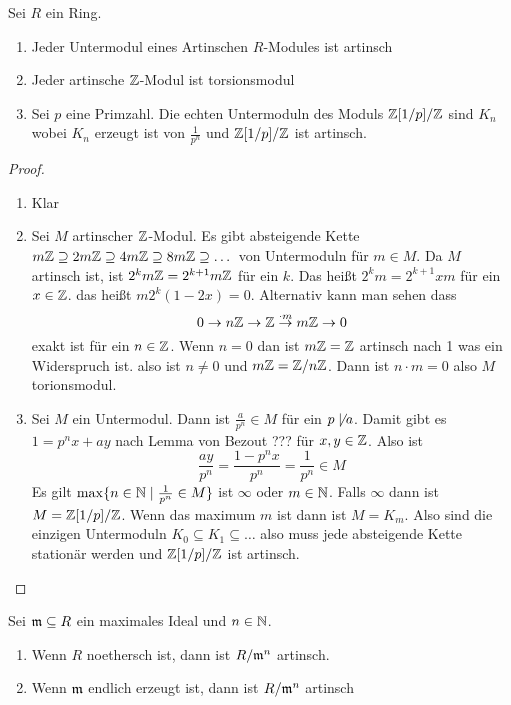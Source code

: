 \begin{Lemma}
    Sei \(R\) ein Ring.
    \begin{enumerate}
        \item Jeder Untermodul eines Artinschen \(R\)-Modules ist artinsch
        \item Jeder artinsche \(\mathbb{Z}\)-Modul ist torsionsmodul
        \item Sei \(p\) eine Primzahl. Die echten Untermoduln des Moduls \(\mathbb{Z}[1/p]/\mathbb{Z}\) sind \(K_n\) wobei \(K_n\) erzeugt ist von \(\frac{1}{p^n}\) und \(\mathbb{Z}[1/p]/\mathbb{Z}\) ist artinsch.
    \end{enumerate}
\end{Lemma}
\begin{proof}
    \begin{enumerate}
        \item Klar
        \item Sei \(M\) artinscher \(\mathbb{Z}\)-Modul. Es gibt absteigende Kette \(m\mathbb{Z}\supseteq 2m\mathbb{Z}\supseteq 4m\mathbb{Z}\supseteq 8m\mathbb{Z}\supseteq\dots\) von Untermoduln für \(m\in M\).
        Da \(M\) artinsch ist, ist \(2^km\mathbb{Z}=2^{k+1}m\mathbb{Z}\) für ein \(k\).
        Das heißt \(2^km=2^{k+1}xm\) für ein \(x\in\mathbb{Z}\).
        das heißt \(m2^k(1-2x)=0\). 
        Alternativ kann man sehen dass 
        \[0\to n\mathbb{Z}\to \mathbb{Z}\stackrel{\cdot m}\to m\mathbb{Z}\to 0\] exakt ist für ein \(n\in\mathbb{Z}\).
        Wenn \(n=0\) dan ist \(m\mathbb{Z}=\mathbb{Z}\) artinsch nach 1 was ein Widerspruch ist. also ist \(n\neq0\) und \(m\mathbb{Z}=\mathbb{Z}/n\mathbb{Z}\). Dann ist \(n\cdot m=0\) also \(M\) torionsmodul.
        \item Sei \(M\) ein Untermodul. Dann ist \(\frac{a}{p^n}\in M\) für ein \(p\not\mid a\). Damit gibt es \(1=p^nx+ay\) nach Lemma von Bezout ??? für \(x,y\in\mathbb{Z}\). Also ist 
        \[\frac{ay}{p^n}=\frac{1-p^nx}{p^n}=\frac{1}{p^n}\in M\]
        Es gilt \(\max\{n\in\mathbb{N}\mid \frac{1}{p^n}\in M\}\) ist \(\infty\) oder \(m\in\mathbb{N}\).
        Falls \(\infty\) dann ist \(M=\mathbb{Z}[1/p]/\mathbb{Z}\).
        Wenn das maximum \(m\) ist dann ist \(M=K_m\).
        Also sind die einzigen Untermoduln \(K_0\subseteq K_1\subseteq\dots\) also muss jede absteigende Kette stationär werden und \(\mathbb{Z}[1/p]/\mathbb{Z}\) ist artinsch.
    \end{enumerate}
\end{proof}
\begin{Lemma}
    Sei \(\mathfrak{m}\subseteq R\) ein maximales Ideal und \(n\in\mathbb{N}\).
    \begin{enumerate}
        \item Wenn \(R\) noethersch ist, dann ist \(R/\mathfrak{m}^n\) artinsch.
        \item Wenn \(\mathfrak{m}\) endlich erzeugt ist, dann ist \(R/\mathfrak{m}^n\) artinsch
    \end{enumerate}
\end{Lemma}
